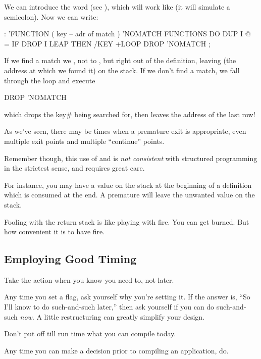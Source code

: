 We can introduce the word  (see ), which will work
like  (it will simulate a semicolon). Now we can write:

\begin{Code}
: 'FUNCTION  ( key -- adr of match )
   'NOMATCH FUNCTIONS DO  DUP  I @ =  IF  DROP I LEAP
   THEN  /KEY +LOOP  DROP  'NOMATCH ;
\end{Code}
If we find a match we , not to , but right out of the definition,
leaving  (the address at which we found it) on the stack. If we don't
find a match, we fall through the loop and execute

\begin{Code}
DROP  'NOMATCH
\end{Code}
which drops the key\# being searched for, then leaves the address of the
last row!

As we've seen, there may be times when a premature exit is appropriate,
even multiple exit points and multiple ``continue'' points.

Remember though, this use of  and  is \emph{not consistent}
with structured programming in the strictest sense, and requires great
care.

For instance, you may have a value on the stack at the beginning of
a definition which is consumed at the end. A premature  will leave
the unwanted value on the stack.

Fooling with the return stack is like playing with fire. You can get
burned. But how convenient it is to have fire.%

\subsection{Employing Good Timing}%

\begin{tip}
Take the action when you know you need to, not later.
\end{tip}
Any time you set a flag, ask yourself why you're setting it. If the answer
is, ``So I'll know to do such-and-such later,'' then ask yourself if you can
do such-and-such \emph{now}. A little restructuring can greatly simplify your
design.

\begin{tip}
Don't put off till run time what you can compile today.
\end{tip}
Any time you can make a decision prior to compiling an application, do.

